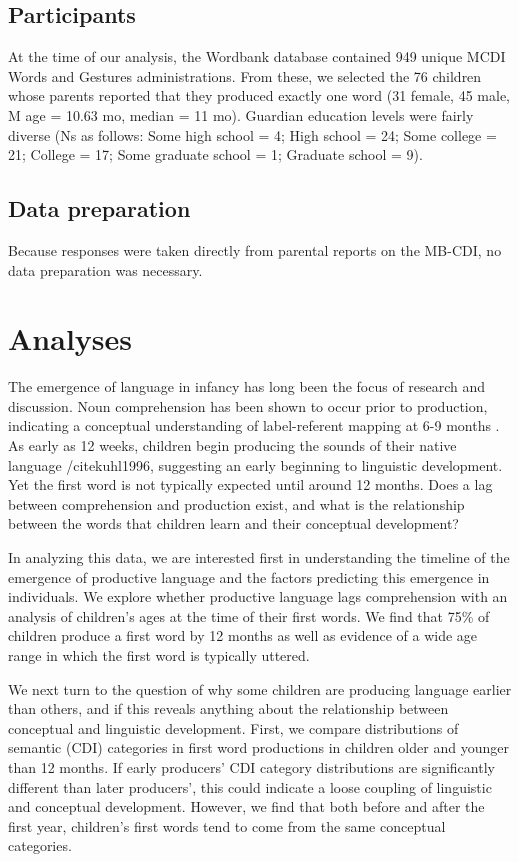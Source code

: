 \documentclass[10pt,letterpaper]{article}
\begin{document}
\subsection{Participants}
At the time of our analysis, the Wordbank database contained 949 unique MCDI Words and Gestures administrations. From these, we selected the 76 children whose parents reported that they produced exactly one word (31 female, 45 male, M age = 10.63 mo, median = 11 mo). Guardian education levels were fairly diverse (Ns as follows: Some high school = 4; High school = 24; Some college = 21; College = 17; Some graduate school = 1; Graduate school = 9). 

\subsection{Data preparation}
Because responses were taken directly from parental reports on the MB-CDI, no data preparation was necessary.

\section{Analyses}
The emergence of language in infancy has long been the focus of research and discussion. Noun comprehension has been shown to occur prior to production, indicating a conceptual understanding of label-referent mapping at 6-9 months \cite{tincoff1999,tincoff2012,bergelson2012}. As early as 12 weeks, children begin producing the sounds of their native language /cite{kuhl1996}, suggesting an early beginning to linguistic development. Yet the first word is not typically expected until around 12 months. Does a lag between comprehension and production exist, and what is the relationship between the words that children learn and their conceptual development? 

In analyzing this data, we are interested first in understanding the timeline of the emergence of productive language and the factors predicting this emergence in individuals. We explore whether productive language lags comprehension with an analysis of children's ages at the time of their first words. We find that 75\% of children produce a first word by 12 months as well as evidence of a wide age range in which the first word is typically uttered.

We next turn to the question of why some children are producing language earlier than others, and if this reveals anything about the relationship between conceptual and linguistic development. First, we compare distributions of semantic (CDI) categories in first word productions in children older and younger than 12 months. If early producers' CDI category distributions are significantly different than later producers', this could indicate a loose coupling of linguistic and conceptual development. However, we find that both before and after the first year, children's first words tend to come from the same conceptual categories.
\end{document}
